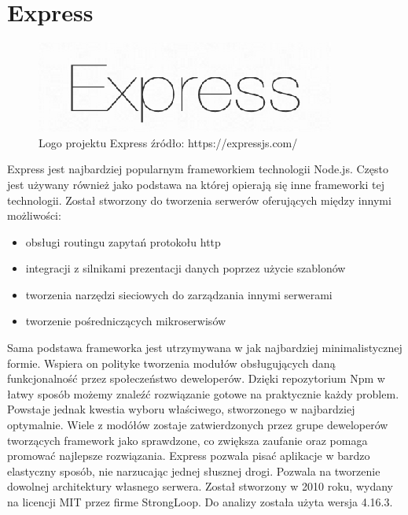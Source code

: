 \documentclass[12pt]{report}
\begin{document}
  \section{Express}
    \begin{figure}[!hb]
      \centering
      \includegraphics[width=\textwidth,height=\textheight,keepaspectratio]{logo_express.png} 
      \caption{Logo projektu Express \newline źródło: https://expressjs.com/}
    \end{figure}
    Express jest najbardziej popularnym frameworkiem technologii Node.js.
    Często jest używany również jako podstawa na której opierają się inne frameworki tej technologii.
    Został stworzony do tworzenia serwerów oferujących między innymi możliwości:
    \begin{itemize}
      \item obsługi routingu zapytań protokołu http
      \item integracji z silnikami prezentacji danych poprzez użycie szablonów
      \item tworzenia narzędzi sieciowych do zarządzania innymi serwerami
      \item tworzenie pośredniczących mikroserwisów
    \end{itemize} 
    Sama podstawa frameworka jest utrzymywana w jak najbardziej minimalistycznej formie.
    Wspiera on polityke tworzenia modułów obsługujących daną funkcjonalność przez społeczeństwo deweloperów.
    Dzięki repozytorium Npm w łatwy sposób możemy znaleźć rozwiązanie gotowe na praktycznie każdy problem.
    Powstaje jednak kwestia wyboru właściwego, stworzonego w najbardziej optymalnie.
    Wiele z modółów zostaje zatwierdzonych przez grupe deweloperów tworzących framework jako sprawdzone, co zwiększa zaufanie oraz pomaga promować najlepsze rozwiązania.
    Express pozwala pisać aplikacje w bardzo elastyczny sposób, nie narzucając jednej słusznej drogi.
    Pozwala na tworzenie dowolnej architektury własnego serwera.
    Został stworzony w 2010 roku, wydany na licencji MIT przez firme StrongLoop.
    Do analizy została użyta wersja 4.16.3.
\end{document}
